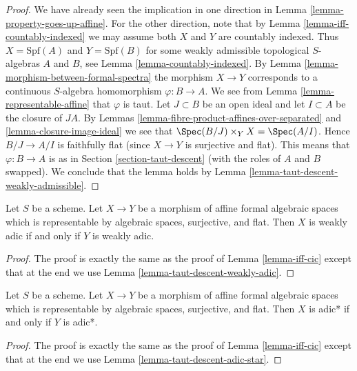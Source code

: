 \begin{proof}
We have already seen the implication in one direction in
Lemma \ref{lemma-property-goes-up-affine}. For the other direction,
note that by Lemma \ref{lemma-iff-countably-indexed} we may assume
both $X$ and $Y$ are countably indexed. Thus $X = \text{Spf}(A)$
and $Y = \text{Spf}(B)$ for some weakly admissible topological
$S$-algebras $A$ and $B$, see Lemma \ref{lemma-countably-indexed}.
By Lemma \ref{lemma-morphism-between-formal-spectra}
the morphism $X \to Y$ corresponds to a continuous $S$-algebra
homomorphism $\varphi : B \to A$. We see from
Lemma \ref{lemma-representable-affine} that $\varphi$ is taut.
Let $J \subset B$ be an open ideal and let $I \subset A$
be the closure of $JA$. By
Lemmas \ref{lemma-fibre-product-affines-over-separated} and
\ref{lemma-closure-image-ideal}
we see that $\Spec(B/J) \times_Y X = \Spec(A/I)$.
Hence $B/J \to A/I$ is faithfully flat (since $X \to Y$ is surjective
and flat). This means that $\varphi : B \to A$ is as in
Section \ref{section-taut-descent} (with the roles of $A$ and $B$ swapped).
We conclude that the lemma holds by
Lemma \ref{lemma-taut-descent-weakly-admissible}.
\end{proof}

\begin{lemma}
\label{lemma-iff-weakly-adic}
Let $S$ be a scheme. Let $X \to Y$ be a morphism of affine
formal algebraic spaces which is representable by algebraic spaces,
surjective, and flat. Then $X$ is weakly adic
if and only if $Y$ is weakly adic.
\end{lemma}

\begin{proof}
The proof is exactly the same as the proof of
Lemma \ref{lemma-iff-cic} except that at the end we use
Lemma \ref{lemma-taut-descent-weakly-adic}.
\end{proof}

\begin{lemma}
\label{lemma-iff-adic-star}
Let $S$ be a scheme. Let $X \to Y$ be a morphism of affine
formal algebraic spaces which is representable by algebraic spaces,
surjective, and flat. Then $X$ is adic* if and only if $Y$ is adic*.
\end{lemma}

\begin{proof}
The proof is exactly the same as the proof of
Lemma \ref{lemma-iff-cic} except that at the end we use
Lemma \ref{lemma-taut-descent-adic-star}.
\end{proof}

